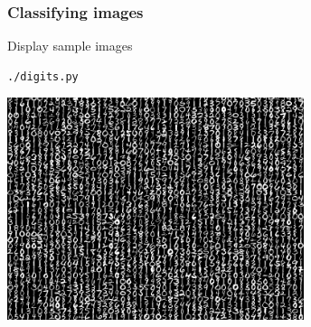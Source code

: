 \begin{frame}[fragile]
  \frametitle{Classifying images}

  \begin{center}

    \begin{block}{Display sample images}
        \begin{lstlisting}[language=bash]
 ./digits.py
        \end{lstlisting}
    \end{block}
    \vskip10pt
    \includegraphics[width=0.65\textwidth]{../../code/image_data/sample_digits.png}
  \end{center}

\end{frame}
